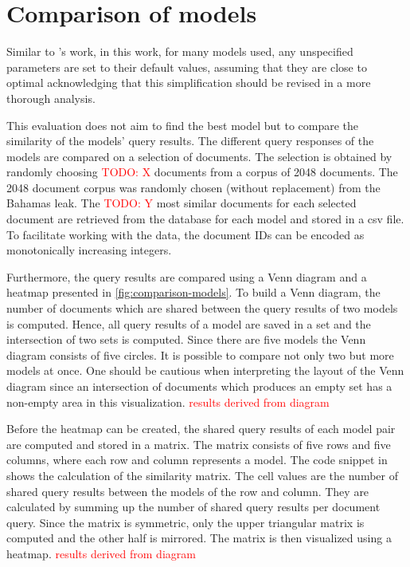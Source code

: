 \section{Comparison of models}\label{sec:evaluation-models}

Similar to \citeauthor{glove2014}'s work, in this work, for many models used, any unspecified parameters are set to their default values, 
assuming that they are close to optimal
acknowledging that this simplification should be revised in a more thorough analysis.

This evaluation does not aim to find the best model but to compare the similarity of the models' query results.
The different query responses of the models are compared on a selection of documents.
The selection is obtained by randomly choosing \textcolor{red}{TODO: X} documents from a corpus of 2048 documents.
The 2048 document corpus was randomly chosen (without replacement) from the Bahamas leak.
The \textcolor{red}{TODO: Y} most similar documents for each selected document are retrieved from the database for each model and stored in a \ac{csv} file.
To facilitate working with the data, the document IDs can be encoded as monotonically increasing integers.

Furthermore, the query results are compared using a Venn diagram and a heatmap presented in \autoref{fig:comparison-models}.
To build a Venn diagram, the number of documents which are shared between the query results of two models is computed.
Hence, all query results of a model are saved in a set and the intersection of two sets is computed.
Since there are five models the Venn diagram consists of five circles.
It is possible to compare not only two but more models at once.
One should be cautious when interpreting the layout of the Venn diagram since 
an intersection of documents which produces an empty set has a non-empty area in this visualization.
\textcolor{red}{results derived from diagram}

Before the heatmap can be created, the shared query results of each model pair are computed and stored in a matrix.
The matrix consists of five rows and five columns, where each row and column represents a model.
The code snippet in  shows the calculation of the similarity matrix.
The cell values are the number of shared query results between the models of the row and column.
They are calculated by summing up the number of shared query results per document query.
Since the matrix is symmetric, only the upper triangular matrix is computed and the other half is mirrored.
The matrix is then visualized using a heatmap.
\textcolor{red}{results derived from diagram}


